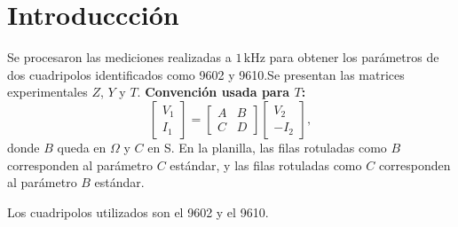 \section{Introduccción}
Se procesaron las mediciones realizadas a $1\,\mathrm{kHz}$ para obtener los parámetros de dos cuadripolos identificados como 9602 y 9610.Se presentan las matrices experimentales $Z$, $Y$ y $T$.
\textbf{Convención usada para $T$:}
\[
\begin{bmatrix} V_1 \\ I_1 \end{bmatrix}
=
\begin{bmatrix} A & B \\ C & D \end{bmatrix}
\begin{bmatrix} V_2 \\ -I_2 \end{bmatrix},
\]
donde $B$ queda en $\Omega$ y $C$ en S. En la planilla, las filas rotuladas como $B$ corresponden al parámetro $C$ estándar, y las filas rotuladas como $C$ corresponden al parámetro $B$ estándar.

Los cuadripolos utilizados son el 9602 y el 9610. 
\newpage
